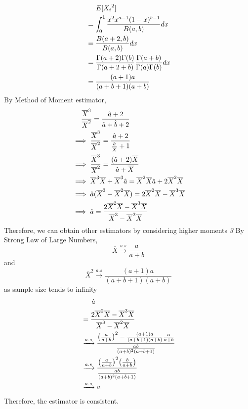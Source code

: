 \documentclass[12pt,letterpaper,fleqn]{article}
\begin{document}
\begin{equation}
  \begin{split}
    &\hspace{1.4em}E[{X_i}^2]\\
    &= \int_0^1 \frac{x^2 x^{a-1} (1-x)^{b-1}}{B(a, b)}dx\\
    &= \frac{B(a+2, b)}{B(a, b)}dx\\
    &= \frac{\Gamma(a+2)\Gamma(b)}{\Gamma(a+2+b)} \frac{\Gamma(a+b)}{\Gamma(a)\Gamma(b)}dx\\
    &= \frac{(a+1)a}{(a+b+1)(a+b)}
  \end{split}
\end{equation}
By Method of Moment estimator,
\begin{equation}
  \begin{split}
    &\hspace{1.4em}\frac{\overline{X}^3}{\overline{X}^2} = \frac{\hat{a}+2}{\hat{a}+\hat{b}+2}\\
    &\implies \frac{\overline{X}^3}{\overline{X}^2} = \frac{\hat{a}+2}{\frac{\hat{a}}{\overline{X}}+1}\\
    &\implies \frac{\overline{X}^3}{\overline{X}^2} = \frac{(\hat{a}+2)\overline{X}}{\hat{a}+\overline{X}}\\
    &\implies \overline{X}^3\overline{X} + \overline{X}^3\hat{a} = \overline{X}^2\overline{X}\hat{a}+2\overline{X}^2\overline{X}\\
    &\implies \hat{a}(\overline{X}^3 - \overline{X}^2\overline{X}) = 2\overline{X}^2\overline{X} - \overline{X}^3\overline{X}\\
    &\implies \hat{a} = \frac{2\overline{X}^2\overline{X} - \overline{X}^3\overline{X}}{\overline{X}^3 - \overline{X}^2\overline{X}}\\
  \end{split}
\end{equation}
Therefore, we can obtain other estimators by considering higher moments
\newpage
\textit{3}
By Strong Law of Large Numbers,
$$\overline{X}\xrightarrow{a.s}\frac{a}{a+b}$$
and
$$\overline{X}^2\xrightarrow{a.s}\frac{(a+1)a}{(a+b+1)(a+b)}$$
as sample size tends to infinity
\begin{equation}
  \begin{split}
    &\hspace{1.5em}\hat{a}\\
    &=\frac{2\overline{X}^2\overline{X} - \overline{X}^3\overline{X}}{\overline{X}^3 - \overline{X}^2\overline{X}}\\
    &\xrightarrow{a.s} \frac{\bigl(\frac{a}{a+b}\bigr)^2 - \frac{(a+1)a}{(a+b+1)(a+b)} \frac{a}{a+b}}{\frac{ab}{(a+b)^2(a+b+1)}}\\
    &\xrightarrow{a.s} \frac{\bigl(\frac{a}{a+b}\bigr)^2\bigl(\frac{b}{a+b}\bigr)}{\frac{ab}{(a+b)^2(a+\hat{b}+1)}}\\
    &\xrightarrow{a.s} a
  \end{split}
\end{equation}
Therefore, the estimator is consistent.
\end{document}
